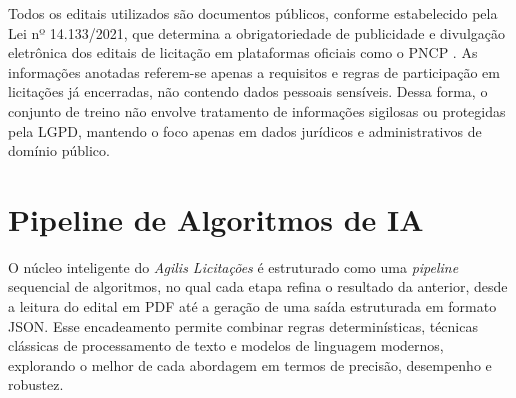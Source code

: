 Todos os editais utilizados são documentos públicos, conforme estabelecido pela Lei nº 14.133/2021, que determina a obrigatoriedade de publicidade e divulgação eletrônica dos editais de licitação em plataformas oficiais como o PNCP \cite{brasil_lei_14133_2021}. As informações anotadas referem-se apenas a requisitos e regras de participação em licitações já encerradas, não contendo dados pessoais sensíveis. Dessa forma, o conjunto de treino não envolve tratamento de informações sigilosas ou protegidas pela LGPD, mantendo o foco apenas em dados jurídicos e administrativos de domínio público.

\section{Pipeline de Algoritmos de IA}

O núcleo inteligente do \textit{Agilis Licitações} é estruturado como uma \textit{pipeline} sequencial de algoritmos, no qual cada etapa refina o resultado da anterior, desde a leitura do edital em PDF até a geração de uma saída estruturada em formato JSON. Esse encadeamento permite combinar regras determinísticas, técnicas clássicas de processamento de texto e modelos de linguagem modernos, explorando o melhor de cada abordagem em termos de precisão, desempenho e robustez.

